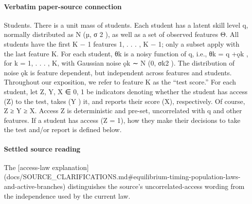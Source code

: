 \documentclass[10pt]{article}
\begin{document}
\paragraph{Verbatim paper-source connection}
\begin{ReviewVerbatim}
Students. There is a unit mass of students. Each student has a latent skill level q, normally
distributed as N (µ, σ 2 ), as well as a set of observed features Θ. All students have the ﬁrst K − 1
features {1, . . . , K − 1}; only a subset apply with the last feature K. For each student, θk is a noisy
function of q, i.e., θk = q +ǫk , for k = 1, . . . , K, with Gaussian noise ǫk ∼ N (0, σk2 ). The distribution
of noise ǫk is feature dependent, but independent across features and students. Throughout our
exposition, we refer to feature K as the “test score.”
For each student, let Z, Y, X ∈ {0, 1} be indicators denoting whether the student has access (Z)
to the test, takes (Y ) it, and reports their score (X), respectively. Of course, Z ≥ Y ≥ X. Access Z
is deterministic and pre-set, uncorrelated with q and other features. If a student has access (Z = 1),
how they make their decisions to take the test and/or report is deﬁned below.
\end{ReviewVerbatim}

\paragraph{Settled source reading}
\begin{sloppypar}
The [access-\allowbreak{}law explanation](docs/\allowbreak{}SOURCE\_\allowbreak{}CLARIFICATIONS.\allowbreak{}md\#equilibrium-\allowbreak{}timing-\allowbreak{}population-\allowbreak{}laws-\allowbreak{}and-\allowbreak{}active-\allowbreak{}branches) distinguishes the source's uncorrelated-\allowbreak{}access wording from the independence used by the current law.\allowbreak{}
\end{sloppypar}
\end{document}
